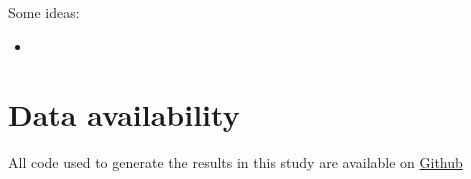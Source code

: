 \documentclass[10pt,aps,pre,twocolumn,nopacs,final,letterpaper,superscriptaddress,longbibliography]{revtex4-2}
\begin{document}
Some ideas:
\begin{itemize}
    \item 
\end{itemize}


\section*{Data availability}

All code used to generate the results in this study are available on \href{https://github.com/nwlandry/heterogeneous-complex-network-reconstruction}{Github} \cite{zenodo}



\end{document}
